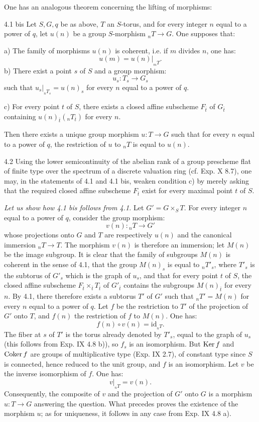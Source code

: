 One has an analogous theorem concerning the lifting of morphisms:
\begin{theorem}{4.1 bis}\label{XV.4.1bis}
Let $S,G,q$ be as above, $T$ an $S$-torus, and for every integer $n$ equal to a power of $q$, let $u(n)$ be a group $S$-morphism ${}_nT\to G$. One supposes that:

\noindent a) The family of morphisms $u(n)$ is coherent, i.e. if $m$ divides $n$, one has:
\[
u(m)=u(n)|_{{}_mT}.
\]
\noindent b) There exist a point $s$ of $S$ and a group morphism:
\[
u_s:T_s\to G_s
\]
such that $u_s|_{{}_nT_s}=u(n)_s$ for every $n$ equal to a power of $q$.

\noindent c) For every point $t$ of $S$, there exists a closed affine subscheme $F_{\bar t}$ of $G_{\bar t}$ containing $u(n)_{\bar t}({}_nT_{\bar t})$ for every $n$.

Then there exists a unique group morphism $u:T\to G$ such that for every $n$ equal to a power of $q$, the restriction of $u$ to ${}_nT$ is equal to $u(n)$.
\end{theorem}
\begin{remark}{4.2}\label{XV.4.2}
Using the lower semicontinuity of the abelian rank of a group prescheme flat of finite type over the spectrum of a discrete valuation ring (cf. Exp. X 8.7), one may, in the statements of 4.1 and 4.1 bis, weaken condition c) by merely asking that the required closed affine subscheme $F_{\bar t}$ exist for every maximal point $t$ of $S$.
\end{remark}

\par\noindent\emph{Let us show how 4.1 bis follows from 4.1.} Let $G'=G\times_S T$. For every integer $n$ equal to a power of $q$, consider the group morphism:
\[
v(n):{}_nT\to G'
\]
whose projections onto $G$ and $T$ are respectively $u(n)$ and the canonical immersion ${}_nT\to T$. The morphism $v(n)$ is therefore an immersion; let $M(n)$ be the image subgroup.
It is clear that the family of subgroups $M(n)$ is coherent in the sense of 4.1, that the group $M(n)_s$ is equal to ${}_nT'_s$, where $T'_s$ is the subtorus of $G'_s$ which is the graph of $u_s$, and that for every point $t$ of $S$, the closed affine subscheme $F_{\bar t}\times_{\bar t}T_{\bar t}$ of $G'_{\bar t}$ contains the subgroups $M(n)_{\bar t}$ for every $n$. By 4.1, there therefore exists a subtorus $T'$ of $G'$ such that ${}_nT'=M(n)$ for every $n$ equal to a power of $q$. Let $f$ be the restriction to $T'$ of the projection of $G'$ onto $T$, and $f(n)$ the restriction of $f$ to $M(n)$. One has:
\[
f(n)\circ v(n)=\mathrm{id}_{{}_nT}.
\]
The fiber at $s$ of $T'$ is the torus already denoted by $T'_s$, equal to the graph of $u_s$ (this follows from Exp. IX 4.8 b)), so $f_s$ is an isomorphism. But $\operatorname{Ker} f$ and $\operatorname{Coker} f$ are groups of multiplicative type (Exp. IX 2.7), of constant type since $S$ is connected, hence reduced to the unit group, and $f$ is an isomorphism. Let $v$ be the inverse isomorphism of $f$. One has:
\[
v|_{{}_nT}=v(n).
\]
Consequently, the composite of $v$ and the projection of $G'$ onto $G$ is a morphism $u:T\to G$ answering the question. What precedes proves the existence of the morphism $u$; as for uniqueness, it follows in any case from Exp. IX 4.8 a).

